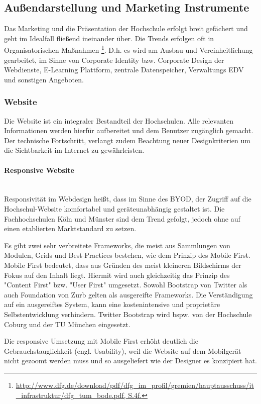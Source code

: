 \subsection{Außendarstellung und Marketing Instrumente}
Das Marketing und die Präsentation der Hochschule erfolgt breit gefächert und geht im Idealfall fließend ineinander über. Die Trends erfolgen oft in Organisatorischen Maßnahmen \footnote{\url{http://www.dfg.de/download/pdf/dfg_im_profil/gremien/hauptausschuss/it_infrastruktur/dfg_tum_bode.pdf, S.4f.}}. D.h. es wird am Ausbau und Vereinheitlichung gearbeitet, im Sinne von Corporate Identity bzw. Corporate Design der Webdienste, E-Learning Plattform, zentrale Datenspeicher, Verwaltungs EDV und sonstigen Angeboten.

\subsubsection{Website}
Die Website ist ein integraler Bestandteil der Hochschulen. Alle relevanten Informationen werden hierfür aufbereitet und dem Benutzer zugänglich gemacht. Der technische Fortschritt, verlangt zudem Beachtung neuer Designkriterien um die Sichtbarkeit im Internet zu gewährleisten.

\paragraph{Responsive Website}\mbox{}\\ %
Responsivität im Webdesign heißt, dass im Sinne des BYOD, der Zugriff auf die Hochschul-Website komfortabel und geräteunabhängig gestaltet ist. Die Fachhochschulen Köln und Münster sind dem Trend gefolgt, jedoch ohne auf einen etablierten Marktstandard zu setzen.

Es gibt zwei sehr verbreitete Frameworks, die meist aus Sammlungen von Modulen, Grids und Best-Practices bestehen, wie dem Prinzip des Mobile First. Mobile First bedeutet, dass aus Gründen des meist kleineren Bildschirms der Fokus auf den Inhalt liegt. Hiermit wird auch gleichzeitig das Prinzip des "Content First" bzw. "User First" umgesetzt. Sowohl Bootstrap von Twitter als auch Foundation von Zurb gelten als ausgereifte Frameworks. Die Verständigung auf ein ausgereiftes System, kann eine kostenintensive und proprietäre Selbstentwicklung verhindern. Twitter Bootstrap wird bspw. von der Hochschule Coburg und der TU München eingesetzt.

Die responsive Umsetzung mit Mobile First erhöht deutlich die Gebrauchstauglichkeit (engl. Usability), weil die Website auf dem Mobilgerät nicht gezoomt werden muss und so ausgeliefert wie der Designer es konzipiert hat. 


